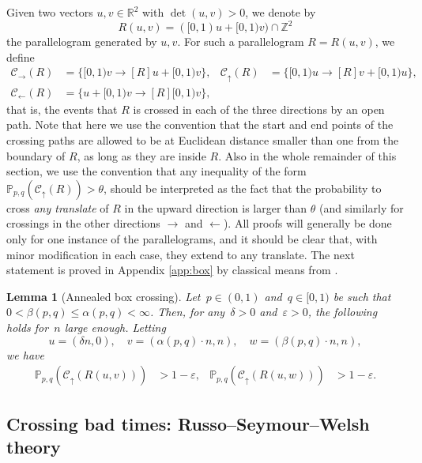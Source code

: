 \documentclass[pdflatex,sn-mathphys-num]{sn-jnl}%
\newcommand{\cC}{\ensuremath{\mathcal C}}
\newcommand{\bbP}{{\ensuremath{\mathbb P}} }
\newcommand{\bbR}{{\ensuremath{\mathbb R}} }
\newcommand{\bbZ}{{\ensuremath{\mathbb Z}} }
\newcommand{\1}{{\ensuremath{\mathbf{1}}} }
\theoremstyle{thmstyleone}%
\newtheorem{lemma}[theorem]{Lemma}%
\theoremstyle{thmstyletwo}%
\theoremstyle{thmstylethree}%
\begin{document}
Given two vectors $u,v\in \bbR^2$ with $\det(u,v)>0$, we denote by \[R(u,v)=([0,1)u+[0,1)v)\cap\bbZ^2\]
the parallelogram generated by $u,v$. For 
such a parallelogram $R=R(u,v)$, we define
\begin{align*}
\cC_\rightarrow(R)&=\{[0,1)v\to[R]u+[0,1)v\},&
\cC_\uparrow(R)&=\{[0,1)u\to[R]v+[0,1)u\},\\
\cC_\leftarrow(R)&=\{u+[0,1)v\to[R]{}[0,1)v\},
\end{align*}
that is, the events that $R$ is crossed in each of the three directions by an open path. Note that here we use the convention that the start and end points of the crossing paths are allowed to be at Euclidean distance smaller than one from the boundary of $R$, as long as they are inside $R$. Also in the whole remainder of this section, we use the convention that any inequality of the form $\mathbb P_{p,q}(\cC_\uparrow(R))> \theta$, should be interpreted as the fact that the probability to cross {\it any translate} of $R$ in the upward direction is larger than $\theta$ (and similarly for crossings in the other directions $\rightarrow$ and $\leftarrow$). All proofs will generally be done only for one instance of the parallelograms, and it should be clear that, with minor modification in each case, they extend to any translate. The next statement is proved in Appendix \ref{app:box} by classical means from \cite{Durrett84}.
\begin{lemma}[Annealed box crossing]
\label{lem:crossing}
Let~$p \in (0,1)$ and~$q \in [0,1)$ be such that~$0< \beta(p,q) \le \alpha(p,q) < \infty$. Then, for any~$\delta > 0$ and~$\varepsilon > 0$, the following holds for~$n$ large enough. Letting
\begin{equation}
\label{eq:def:u:v}u = (\delta n,0),\quad v = (\alpha(p,q)\cdot n,n),\quad w = (\beta(p,q) \cdot n,n),
\end{equation}
we have
\begin{align*}
\bbP_{p,q}(\cC_\uparrow(R(u,v))) &{}> 1-\varepsilon,& \bbP_{p,q}(\cC_\uparrow(R(u,w))) &{}> 1-\varepsilon.
\end{align*}
\end{lemma}




\subsection{Crossing bad times: Russo--Seymour--Welsh theory}\label{sec:RSW}
\end{document}
